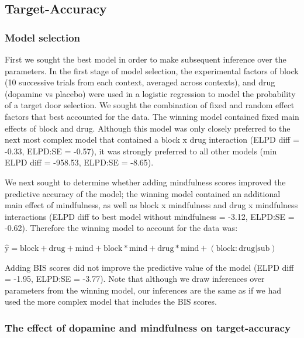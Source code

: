 \documentclass[
  man]{apa6}
\begin{document}
\hypertarget{target-accuracy-1}{%
\subsection{Target-Accuracy}\label{target-accuracy-1}}

\label{sec:Target-Accuracy Results}

\hypertarget{model-selection}{%
\subsubsection{Model selection}\label{model-selection}}

First we sought the best model in order to make subsequent inference over the parameters. In the first stage of model selection, the experimental factors of block (10 successive trials from each context, averaged across contexts), and drug (dopamine vs placebo) were used in a logistic regression to model the probability of a target door selection. We sought the combination of fixed and random effect factors that best accounted for the data. The winning model contained fixed main effects of block and drug. Although this model was only closely preferred to the next most complex model that contained a block x drug interaction (ELPD diff = -0.33, ELPD:SE = -0.57), it was strongly preferred to all other models (min ELPD diff = -958.53, ELPD:SE = -8.65).

We next sought to determine whether adding mindfulness scores improved the predictive accuracy of the model; the winning model contained an additional main effect of mindfulness, as well as block x mindfulness and drug x mindfulness interactions (ELPD diff to best model without mindfulness = -3.12, ELPD:SE = -0.62). Therefore the winning model to account for the data was:

\(\mathrm{\hat{y}} = \mathrm{block} + \mathrm{drug} + \mathrm{mind} + \mathrm{block*mind} + \mathrm{drug*mind} + \mathrm{(block:drug|sub)}\)

Adding BIS scores did not improve the predictive value of the model (ELPD diff = -1.95, ELPD:SE = -3.77). Note that although we draw inferences over parameters from the winning model, our inferences are the same as if we had used the more complex model that includes the BIS scores.

\hypertarget{the-effect-of-dopamine-and-mindfulness-on-target-accuracy}{%
\subsubsection{The effect of dopamine and mindfulness on target-accuracy}\label{the-effect-of-dopamine-and-mindfulness-on-target-accuracy}}
\end{document}
